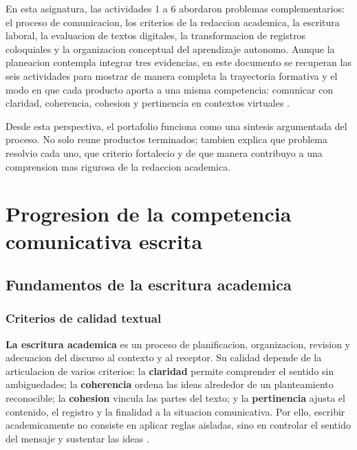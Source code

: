 \documentclass[
	spanish,
	letterpaper, oneside
]{article}
\begin{document}
En esta asignatura, las actividades 1 a 6 abordaron problemas complementarios: el proceso de comunicacion, los criterios de la redaccion academica, la escritura laboral, la evaluacion de textos digitales, la transformacion de registros coloquiales y la organizacion conceptual del aprendizaje autonomo. Aunque la planeacion contempla integrar tres evidencias, en este documento se recuperan las seis actividades para mostrar de manera completa la trayectoria formativa y el modo en que cada producto aporta a una misma competencia: comunicar con claridad, coherencia, cohesion y pertinencia en contextos virtuales \citep{correaManualBasicoEscritura2018,nunezcortesEscrituraAcademicaTeoria2015}.

Desde esta perspectiva, el portafolio funciona como una sintesis argumentada del proceso. No solo reune productos terminados; tambien explica que problema resolvio cada uno, que criterio fortalecio y de que manera contribuyo a una comprension mas rigurosa de la redaccion academica.

\section{Progresion de la competencia comunicativa escrita}

\subsection{Fundamentos de la escritura academica}

\subsubsection{Criterios de calidad textual}
\textbf{La escritura academica} es un proceso de planificacion, organizacion, revision y adecuacion del discurso al contexto y al receptor. Su calidad depende de la articulacion de varios criterios: la \textbf{claridad} permite comprender el sentido sin ambiguedades; la \textbf{coherencia} ordena las ideas alrededor de un planteamiento reconocible; la \textbf{cohesion} vincula las partes del texto; y la \textbf{pertinencia} ajusta el contenido, el registro y la finalidad a la situacion comunicativa. Por ello, escribir academicamente no consiste en aplicar reglas aisladas, sino en controlar el sentido del mensaje y sustentar las ideas \citep{correaManualBasicoEscritura2018,nunezcortesEscrituraAcademicaTeoria2015}.
\end{document}
